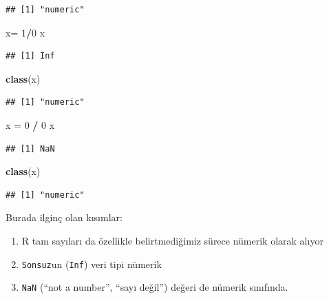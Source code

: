 \documentclass[
]{book}
\newenvironment{Shaded}{\begin{snugshade}}{\end{snugshade}}
\newcommand{\DecValTok}[1]{\textcolor[rgb]{0.00,0.00,0.81}{#1}}
\newcommand{\KeywordTok}[1]{\textcolor[rgb]{0.13,0.29,0.53}{\textbf{#1}}}
\newcommand{\NormalTok}[1]{#1}
\newcommand{\OperatorTok}[1]{\textcolor[rgb]{0.81,0.36,0.00}{\textbf{#1}}}
\newcommand{\StringTok}[1]{\textcolor[rgb]{0.31,0.60,0.02}{#1}}
\providecommand{\tightlist}{%
  \setlength{\itemsep}{0pt}\setlength{\parskip}{0pt}}
\begin{document}
\begin{verbatim}
## [1] "numeric"
\end{verbatim}

\begin{Shaded}
\begin{Highlighting}[]
\NormalTok{x=}\StringTok{ }\DecValTok{1}\OperatorTok{/}\DecValTok{0}
\NormalTok{x}
\end{Highlighting}
\end{Shaded}

\begin{verbatim}
## [1] Inf
\end{verbatim}

\begin{Shaded}
\begin{Highlighting}[]
\KeywordTok{class}\NormalTok{(x)}
\end{Highlighting}
\end{Shaded}

\begin{verbatim}
## [1] "numeric"
\end{verbatim}

\begin{Shaded}
\begin{Highlighting}[]
\NormalTok{x =}\StringTok{ }\DecValTok{0} \OperatorTok{/}\StringTok{ }\DecValTok{0}
\NormalTok{x}
\end{Highlighting}
\end{Shaded}

\begin{verbatim}
## [1] NaN
\end{verbatim}

\begin{Shaded}
\begin{Highlighting}[]
\KeywordTok{class}\NormalTok{(x)}
\end{Highlighting}
\end{Shaded}

\begin{verbatim}
## [1] "numeric"
\end{verbatim}

Burada ilginç olan kısımlar:

\begin{enumerate}
\def\labelenumi{\arabic{enumi}.}
\tightlist
\item
  R tam sayıları da özellikle belirtmediğimiz sürece nümerik olarak alıyor
\item
  \texttt{Sonsuz}un (\texttt{Inf}) veri tipi nümerik
\item
  \texttt{NaN} (``not a number'', ``sayı değil'') değeri de nümerik sınıfında.
\end{enumerate}
\end{document}
